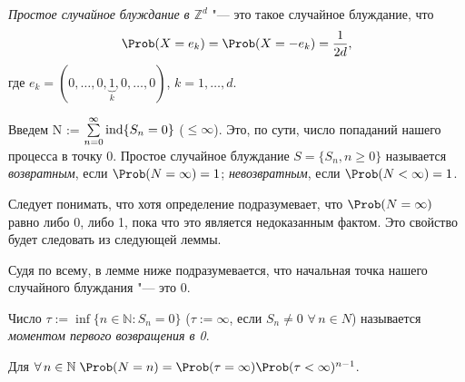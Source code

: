 \begin{df}
  \emph{Простое случайное блуждание в $\mathbb{Z}^{d}$} "--- это такое случайное блуждание, что
  \begin{equation*}
    \Prob(X = e_{k}) = \Prob(X = -e_{k}) = \frac{1}{2d},
  \end{equation*}
  где $e_{k} = (0, \ldots, 0, \underbrace{1}_{k}, 0, \ldots, 0)$, $k = 1, \ldots, d$.
\end{df}

\begin{df}
  Введем N := $\sum\limits_{n=0}^\infty \operatorname{ind} \lbrace S_{n} = 0 \rbrace$ ($\leqslant \infty$). Это, по сути, число попаданий нашего процесса в точку 0. Простое случайное блуждание $S = \lbrace S_{n}, n \geqslant 0\rbrace$ называется \emph{возвратным}, если $\Prob(N = \infty) = 1$; \emph{невозвратным}, если $\Prob(N < \infty) = 1$.
\end{df}

\begin{note}
  Следует понимать, что хотя определение подразумевает, что $\Prob(N = \infty)$ равно либо 0, либо 1, пока что это является недоказанным фактом. Это свойство будет следовать из следующей леммы.
\end{note}

\begin{note}[от наборщика]
  Судя по всему, в лемме ниже подразумевается, что начальная точка нашего случайного блуждания "--- это 0.
\end{note}
\begin{df}
  Число $\tau := \inf\lbrace n \in \mathbb{N} : S_{n} = 0 \rbrace$ ($\tau := \infty$, если $S_{n} \neq 0$ $\forall\, n \in N$) называется \emph{моментом первого возвращения в 0}.
\end{df}

\begin{lem}
  Для  $ \forall\, n \in \mathbb{N} \; \Prob(N = n)  =  \Prob(\tau = \infty)\Prob(\tau < \infty)^{n-1}$.
\end{lem}

